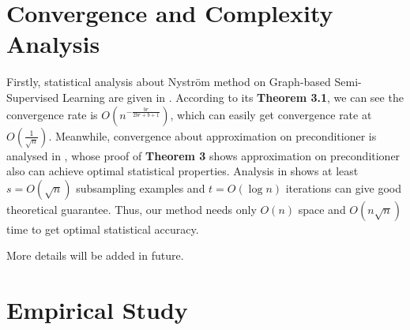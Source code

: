 \documentclass{article}
\begin{document}
\section{Convergence and Complexity Analysis}
Firstly, statistical analysis about Nystr\"om method on Graph-based Semi-Supervised Learning
are given in \cite{rastogi2017manifold}. According to its \textbf{Theorem 3.1}, we can see the convergence rate is
$O(n^{-\frac{br}{2br+b+1}})$, which can easily get convergence rate at $O(\frac{1}{\sqrt{n}})$. Meanwhile, convergence about approximation on preconditioner is analysed in \cite{rudi2017falkon}, whose proof of \textbf{Theorem 3} shows approximation on preconditioner also can achieve optimal statistical properties.
Analysis in \cite{rastogi2017manifold, rudi2017falkon} shows at least $s=O(\sqrt{n})$ subsampling examples
and $t=O(\log n)$ iterations can give good theoretical guarantee.
Thus, our method needs only $O(n)$ space and $O(n\sqrt{n})$ time to get optimal statistical accuracy.

More details will be added in future.

\section{Empirical Study}



\end{document}
